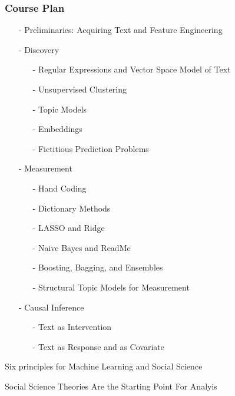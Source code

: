 \documentclass{beamer}
\numberwithin{equation}{section}
\begin{document}
\begin{frame}
\frametitle{Course Plan}

\begin{itemize}
\item[-] Preliminaries: Acquiring Text and Feature Engineering
\item[-] Discovery 
\begin{itemize}
\item[-] Regular Expressions and Vector Space Model of Text
\item[-] Unsupervised Clustering 
\item[-] Topic Models
\item[-] Embeddings 
\item[-] Fictitious Prediction Problems
\end{itemize}  
\item[-] Measurement
\begin{itemize}
  \item[-] Hand Coding
  \item[-] Dictionary Methods
  \item[-] LASSO and Ridge
  \item[-] Naive Bayes and ReadMe
  \item[-] Boosting, Bagging, and Ensembles
  \item[-] Structural Topic Models for Measurement
\end{itemize}
\item[-] Causal Inference
\begin{itemize}
\item[-] Text as Intervention
\item[-] Text as Response and as Covariate
\end{itemize}  
\end{itemize}  

\end{frame}



\begin{frame}

\huge
Six principles for Machine Learning and Social Science

\end{frame}


\begin{frame}
\huge 
Social Science Theories Are the Starting Point For Analyis  \\

\end{frame}
\end{document}
